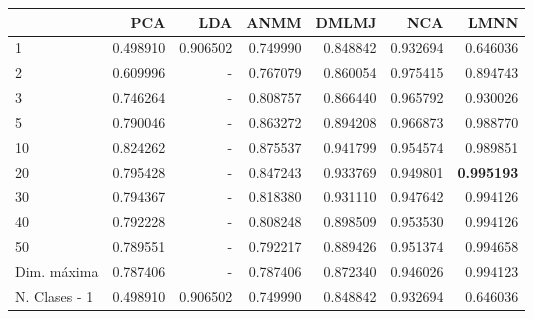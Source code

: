 \begin{tabular}{lrrrrrr}
\toprule
{} &       PCA &       LDA &      ANMM &     DMLMJ &       NCA &      LMNN \\
\midrule
1             &  0.498910 &  0.906502 &  0.749990 &  0.848842 &  0.932694 &  0.646036 \\
2             &  0.609996 &  -        &  0.767079 &  0.860054 &  0.975415 &  0.894743 \\
3             &  0.746264 &  -        &  0.808757 &  0.866440 &  0.965792 &  0.930026 \\
5             &  0.790046 &  -        &  0.863272 &  0.894208 &  0.966873 &  0.988770 \\
10            &  0.824262 &  -        &  0.875537 &  0.941799 &  0.954574 &  0.989851 \\
20            &  0.795428 &  -        &  0.847243 &  0.933769 &  0.949801 &  \textbf{0.995193} \\
30            &  0.794367 &  -        &  0.818380 &  0.931110 &  0.947642 &  0.994126 \\
40            &  0.792228 &  -        &  0.808248 &  0.898509 &  0.953530 &  0.994126 \\
50            &  0.789551 &  -        &  0.792217 &  0.889426 &  0.951374 &  0.994658 \\
Dim. máxima   &  0.787406 &  -        &  0.787406 &  0.872340 &  0.946026 &  0.994123 \\
N. Clases - 1 &  0.498910 &  0.906502 &  0.749990 &  0.848842 &  0.932694 &  0.646036 \\
\bottomrule
\end{tabular}
